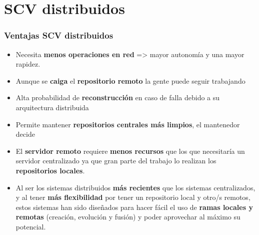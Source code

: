 \section*{SCV distribuidos}
\frame
{
\frametitle{Ventajas SCV distribuidos}
\begin{itemize}
\item Necesita \textbf{menos operaciones en red} => mayor autonomía y una mayor rapidez.
\item Aunque se \textbf{caiga} el \textbf{repositorio remoto} la gente puede seguir trabajando
\item Alta probabilidad de \textbf{reconstrucción} en caso de falla debido a su arquitectura distribuida
\item Permite mantener \textbf{repositorios centrales más limpios}, el mantenedor decide
\item El \textbf{servidor remoto} requiere \textbf{menos recursos} que los que necesitaría un servidor centralizado ya que gran parte del trabajo lo realizan los \textbf{repositorios locales}.
\item Al ser los sistemas distribuidos \textbf{más recientes} que los sistemas centralizados, y al tener \textbf{más flexibilidad} por tener un repositorio local y otro/s remotos, estos sistemas han sido diseñados para hacer fácil el uso de \textbf{ramas locales y remotas} (creación, evolución y fusión) y poder aprovechar al máximo su potencial. 
\end{itemize}
}
